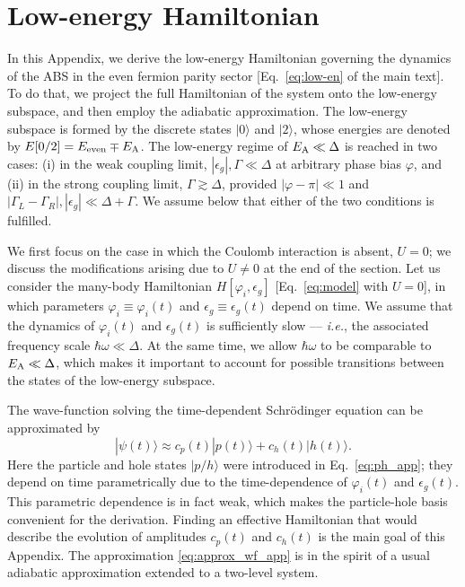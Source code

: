 \documentclass[aps,reprint,longbibliography, prb]{revtex4-2}
\begin{document}
\section{Low-energy Hamiltonian}
\label{sec:app-low-en-ham}
In this Appendix, we derive the low-energy Hamiltonian governing the dynamics of the ABS in the even fermion parity sector [Eq.~\eqref{eq:low-en} of the main text]. To do that, we project the full Hamiltonian of the system onto the low-energy subspace, and then employ the adiabatic approximation. The low-energy subspace is formed by the discrete states $|0\rangle$ and $|2\rangle$, whose energies are denoted by $E[0/2] = E_{\rm even} \mp E_{\rm A}$. The low-energy regime of $E_{\rm A} \ll \Delta$ is reached in two cases: (i) in the weak coupling limit, $|\epsilon_g|, \Gamma \ll \Delta$ at arbitrary phase bias $\varphi$, and (ii) in the strong coupling limit, $\Gamma \gtrsim \Delta$, provided $|\varphi - \pi| \ll 1$ and $|\Gamma_L - \Gamma_R|, |\epsilon_g| \ll \Delta + \Gamma$. We assume below that either of the two conditions is fulfilled. 

We first focus on the case in which the Coulomb interaction is absent, $U = 0$; we discuss the modifications arising due to $U \neq 0$ at the end of the section.
Let us consider the many-body Hamiltonian $H[\varphi_i, \epsilon_g]$ [Eq.~\eqref{eq:model} with $U = 0$], in which parameters $\varphi_i \equiv \varphi_i(t)$ and $\epsilon_g \equiv \epsilon_g(t)$ depend on time.
We assume that the dynamics of $\varphi_i(t)$ and $\epsilon_g(t)$ is sufficiently slow --- \textit{i.e.}, the associated frequency scale $\hbar\omega \ll \Delta$. At the same time, we allow $\hbar\omega$ to be comparable to $E_{\rm A} \ll \Delta$, which makes it important to account for possible transitions between the states of the low-energy subspace.

The wave-function solving the time-dependent Schr\"odinger equation can be approximated by
\begin{equation}\label{eq:approx_wf_app}
    |\psi(t)\rangle \approx c_p(t)|p(t)\rangle + c_h(t)|h(t)\rangle.
\end{equation}
Here the particle and hole states $|p/h\rangle$ were introduced in Eq.~\eqref{eq:ph_app}; they depend on time parametrically due to the time-dependence of $\varphi_i(t)$  and $\epsilon_g(t)$. This parametric dependence is in fact weak, which makes the particle-hole basis convenient for the derivation. Finding an effective Hamiltonian that would describe the evolution of amplitudes $c_p(t)$ and $c_h(t)$ is the main goal of this Appendix. The approximation \eqref{eq:approx_wf_app} is in the spirit of a usual adiabatic approximation extended to a two-level system.
\end{document}

